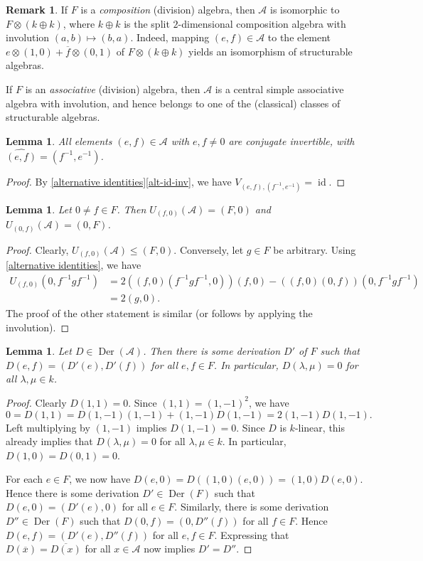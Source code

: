 \documentclass[oneside,a4paper]{amsart} %
\newtheorem{lemma}[theorem]{Lemma}
\theoremstyle{definition}
\newtheorem{remark}[theorem]{Remark}
\DeclareMathOperator{\Der}{Der}
\DeclareMathOperator{\id}{id}
\newcommand{\A}{\mathcal{A}}
\numberwithin{equation}{section}
\begin{document}
\begin{remark}\label{F+F isom}
	If $F$ is a \emph{composition} (division) algebra, then $\A$ is isomorphic to $F\otimes (k\oplus k)$, where $k\oplus k$ is the split $2$-dimensional composition algebra with involution $(a,b)\mapsto (b,a)$.
	Indeed, mapping $(e,f)\in \A$  to the element $e\otimes (1,0)+\overline f\otimes (0,1)$ of $F\otimes (k\oplus k)$ yields an isomorphism of structurable algebras.
	
	If $F$ is an \emph{associative} (division) algebra, then $\A$ is a central simple associative algebra with involution, and hence belongs to one of the (classical) classes of structurable algebras. 
\end{remark}

\begin{lemma}
\label{triangle invertiblity}
	All elements $(e,f)\in\A$ with $e,f\neq 0$ are conjugate invertible, with $\widehat{(e,f)} = (f^{-1},e^{-1})$.
\end{lemma}
\begin{proof}
	By \cref{alternative identities}\cref{alt-id-inv}, we have $V_{(e,f),(f^{-1},e^{-1})}=\id$.
\end{proof}

\begin{lemma}
\label{triangle U operator}
	Let $0 \neq f\in F$. Then $U_{(f,0)}(\A)=(F,0)$ and $U_{(0,f)}(\A)=(0,F)$.
\end{lemma}
\begin{proof}
	Clearly, $U_{(f,0)}(\A)\leq (F,0)$. Conversely, let $g\in F$ be arbitrary. Using \cref{alternative identities}, we have
	\begin{align*}
	   U_{(f,0)}(0,f^{-1}gf^{-1}) &= 2((f,0)(f^{-1}gf^{-1},0))(f,0)-((f,0)(0,f))(0,f^{-1}gf^{-1}) \\
	       &= 2(g,0).
	\end{align*}
	The proof of the other statement is similar (or follows by applying the involution).
\end{proof}

\begin{lemma}
\label{triangle derivation}
	Let $D\in\Der(\A)$. Then there is some derivation $D'$ of $F$ such that $D(e,f)=(D'(e),D'(f))$ for all $e,f\in F$.
	In particular, $D(\lambda,\mu)=0$ for all $\lambda,\mu \in k$.
\end{lemma}
\begin{proof}
	Clearly $D(1,1)=0$. Since $(1,1) = (1,-1)^2$, we have
	\[ 0 = D(1,1) = D(1,-1)(1,-1) + (1,-1)D(1,-1) = 2(1,-1)D(1,-1) . \]
	Left multiplying by $(1,-1)$ implies $D(1,-1)=0$.
	Since $D$ is $k$-linear, this already implies that $D(\lambda,\mu)=0$ for all $\lambda,\mu \in k$.
	In particular, $D(1,0) = D(0,1) = 0$.
	
	For each $e \in F$, we now have $D(e,0)=D((1,0)(e,0))=(1,0)D(e,0)$.
	Hence there is some derivation $D' \in \Der(F)$ such that $D(e,0)=(D'(e),0)$ for all $e\in F$.
	Similarly, there is some derivation $D'' \in \Der(F)$ such that $D(0,f)=(0,D''(f))$ for all $f\in F$.
	Hence $D(e,f) = (D'(e), D''(f))$ for all $e,f \in F$.
	Expressing that $D(\overline{x}) = \overline{D(x)}$ for all $x \in \A$ now implies $D' = D''$.
\end{proof}
\end{document}
